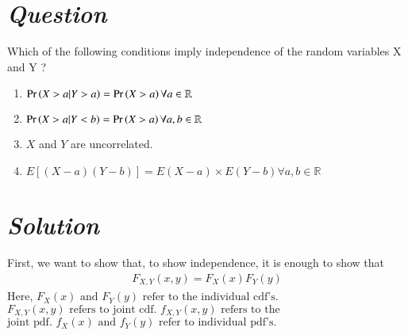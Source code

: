 \documentclass[journal,12pt,twocolumn]{IEEEtran}
\begin{document}
\section*{\emph{Question}}
Which of the following conditions imply independence of the random variables X
and Y ?
\begin{enumerate}
    \item$\Pr\left(X > a|Y > a\right) = \Pr\left(X > a\right) \forall a \in \mathbb{R}$\\ 
    \item$\Pr\left(X > a|Y < b\right) = \Pr\left(X > a\right) \forall a, b \in \mathbb{R}$\\ 
    \item$X$ and $Y$ are uncorrelated.\\
    \item$E[(X-a)(Y-b)]=E(X-a) \times E(Y-b) \forall a, b \in \mathbb{R}$\\
\end{enumerate}
\section*{\emph{Solution}}
First, we want to show that, to show independence, it is enough to show that 
\begin{align}
    F_{X, Y}(x,y) = F_X(x)F_Y(y)\label{eqmain}
\end{align}
Here,
\begin{math}
    F_X(x) \text{ and } F_Y(y) \text{ refer to the individual cdf's.}
\end{math}
\begin{math}
    F_{X, Y}(x,y) \text{ refers to joint cdf. } f_{X, Y}(x,y) \text{ refers to the}
\end{math}
\begin{math}
    \text{joint pdf. } f_X(x) \text{ and } f_Y(y) \text{ refer to individual pdf's.}
\end{math}
\end{document}
